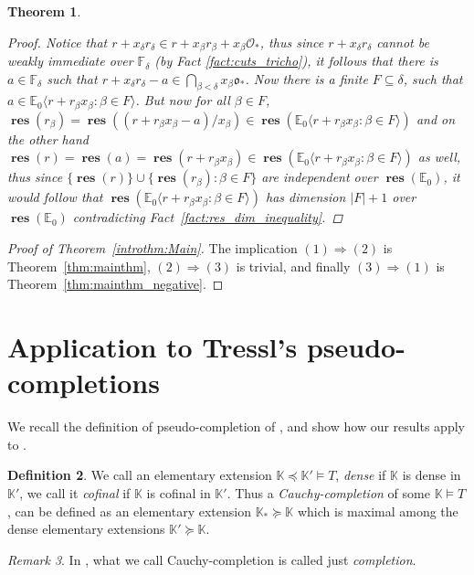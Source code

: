 \documentclass{amsart}
\newtheorem{theorem}{Theorem}
\theoremstyle{remark}
\newtheorem{remark}[theorem]{Remark}
\theoremstyle{definition}
\newtheorem{definition}[theorem]{Definition}
\theoremstyle{plain}
\newcommand{\bE}{\mathbb E}
\newcommand{\bF}{\mathbb F}
\newcommand{\bK}{\mathbb K}
\newcommand{\cO}{\mathcal O}
\newcommand{\co}{\mathfrak o}
\DeclareMathOperator{\res}{\mathbf{res}}
\theoremstyle{plain}
\begin{document}
\begin{theorem}
\begin{proof}
        Notice that $r+x_\delta r_\delta \in r+x_\beta r_\beta + x_\beta \cO_*$, thus since $r+x_\delta r_\delta$ cannot be weakly immediate over $\bF_\delta$ (by Fact \ref{fact:cuts_tricho}), it follows that there is $a \in \bF_{\delta}$ such that $r+x_\delta r_\delta - a \in \bigcap_{\beta<\delta} x_\beta \co_*$.
        Now there is a finite $F \subseteq \delta$, such that $a \in \bE_0 \langle r+ r_\beta x_\beta: \beta\in F\rangle$. But now for all $\beta \in F$, $\res(r_\beta)=\res((r+r_\beta x_\beta-a)/x_\beta) \in \res (\bE_0 \langle r+r_\beta x_\beta : \beta \in F\rangle)$ and on the other hand $\res(r)=\res(a)=\res(r+r_\beta x_\beta) \in \res(\bE_0\langle r+ r_\beta x_\beta: \beta\in F\rangle)$ as well, thus since $\{\res(r)\} \cup \{\res(r_\beta): \beta \in F\}$ are independent over $\res(\bE_0)$, it would follow that $\res(\bE_0 \langle r+ r_\beta x_\beta: \beta \in F\rangle)$ has dimension $|F|+1$ over $\res(\bE_0)$ contradicting Fact~\ref{fact:res_dim_inequality}.
    \end{proof}
\end{theorem}

\begin{proof}[Proof of Theorem~\ref{introthm:Main}]
    The implication $(1) \Rightarrow (2)$ is Theorem~\ref{thm:mainthm}, $(2) \Rightarrow (3)$ is trivial, and finally $(3) \Rightarrow (1)$ is Theorem~\ref{thm:mainthm_negative}. 
\end{proof}

\section{Application to Tressl's pseudo-completions}\label{sec:Tressl_problem}

We recall the definition of pseudo-completion of \cite{tressl2006pseudo}, and show how our results apply to \cite[Problem~5.12]{tressl2006pseudo}.

\begin{definition}
    We call an elementary extension $\bK \preceq \bK'\models T$, \emph{dense} if $\bK$ is dense in $\bK'$, we call it \emph{cofinal} if $\bK$ is cofinal in $\bK'$.
    Thus a \emph{Cauchy-completion} of some $\bK \models T$, can be defined as an elementary extension $\bK_* \succeq \bK$ which is maximal among the dense elementary extensions $\bK'\succeq \bK$.
\end{definition}

\begin{remark}\label{rmk:Cauchy-completion_terminology}
    In \cite[Sec.~3]{tressl2006pseudo}, what we call Cauchy-completion is called just \emph{completion}. 
\end{remark}
\end{document}
